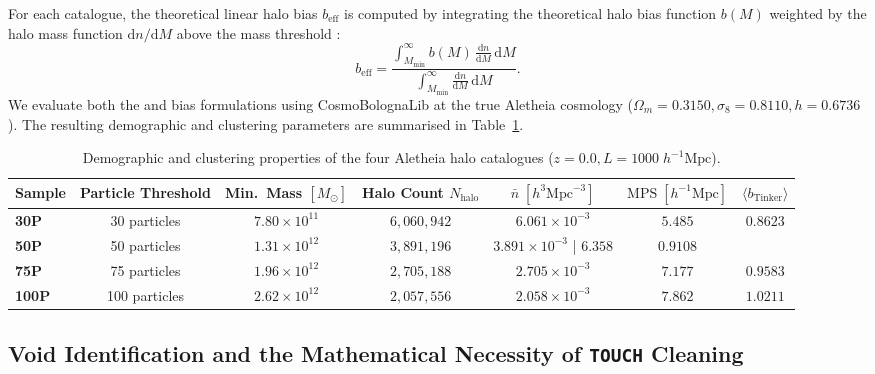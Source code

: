 \documentclass[12pt]{report}
\begin{document}
For each catalogue, the theoretical linear halo bias $b_{\mathrm{eff}}$ is computed by integrating the theoretical halo bias function $b(M)$ weighted by the halo mass function $\mathrm{d}n/\mathrm{d}M$ above the mass threshold \citep{Sheth2001, Tinker2010}:
\begin{equation}
    b_{\mathrm{eff}} = \frac{\int_{M_{\mathrm{min}}}^\infty b(M)\, \frac{\mathrm{d}n}{\mathrm{d}M}\, \mathrm{d}M}{\int_{M_{\mathrm{min}}}^\infty \frac{\mathrm{d}n}{\mathrm{d}M}\, \mathrm{d}M}.
\end{equation}
We evaluate both the \citet{Tinker2010} and \citet{Sheth2001} bias formulations using CosmoBolognaLib at the true Aletheia cosmology ($\Omega_m = 0.3150, \sigma_8 = 0.8110, h = 0.6736$). The resulting demographic and clustering parameters are summarised in Table~\ref{tab:halo_demographics}.

\begin{table}[H]
    \centering
    \caption{Demographic and clustering properties of the four Aletheia halo catalogues ($z=0.0, L=1000\;h^{-1}\mathrm{Mpc}$).}
    \label{tab:halo_demographics}
    \begin{tabular}{lcccccc}
        \toprule
        \textbf{Sample} & \textbf{Particle Threshold} & \textbf{Min.\ Mass $[M_\odot]$} & \textbf{Halo Count $N_{\mathrm{halo}}$} & $\bar{n}\;[h^3\mathrm{Mpc}^{-3}]$ & $\mathrm{MPS}\;[h^{-1}\mathrm{Mpc}]$ & $\langle b_{\mathrm{Tinker}}\rangle$ \\
        \midrule
        \textbf{30P}  & 30 particles  & $7.80 \times 10^{11}$ & $6,060,942$ & $6.061 \times 10^{-3}$ & $5.485$ & $0.8623$ \\
        \textbf{50P}  & 50 particles  & $1.31 \times 10^{12}$ & $3,891,196$ & $3.891 \times 10^{-3}$ | $6.358$ & $0.9108$ \\
        \textbf{75P}  & 75 particles  & $1.96 \times 10^{12}$ & $2,705,188$ & $2.705 \times 10^{-3}$ & $7.177$ & $0.9583$ \\
        \textbf{100P} & 100 particles & $2.62 \times 10^{12}$ & $2,057,556$ & $2.058 \times 10^{-3}$ & $7.862$ & $1.0211$ \\
        \bottomrule
    \end{tabular}
\end{table}

\subsection{Void Identification and the Mathematical Necessity of \texttt{TOUCH} Cleaning}
\end{document}
